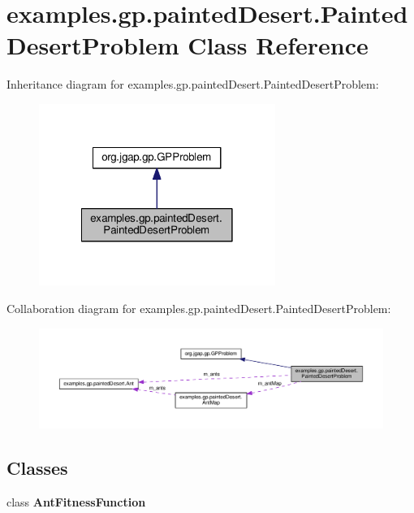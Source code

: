 \hypertarget{classexamples_1_1gp_1_1painted_desert_1_1_painted_desert_problem}{\section{examples.\-gp.\-painted\-Desert.\-Painted\-Desert\-Problem Class Reference}
\label{classexamples_1_1gp_1_1painted_desert_1_1_painted_desert_problem}
}


Inheritance diagram for examples.\-gp.\-painted\-Desert.\-Painted\-Desert\-Problem\-:
\nopagebreak
\begin{figure}[H]
\begin{center}
\leavevmode
\includegraphics[width=218pt]{classexamples_1_1gp_1_1painted_desert_1_1_painted_desert_problem__inherit__graph}
\end{center}
\end{figure}


Collaboration diagram for examples.\-gp.\-painted\-Desert.\-Painted\-Desert\-Problem\-:
\nopagebreak
\begin{figure}[H]
\begin{center}
\leavevmode
\includegraphics[width=350pt]{classexamples_1_1gp_1_1painted_desert_1_1_painted_desert_problem__coll__graph}
\end{center}
\end{figure}
\subsection*{Classes}
\begin{DoxyCompactItemize}
\item 
class {\bfseries Ant\-Fitness\-Function}
\end{DoxyCompactItemize}
